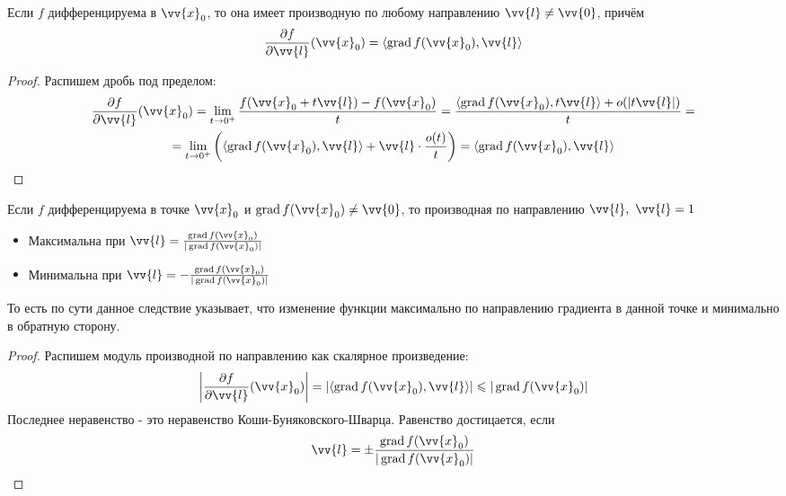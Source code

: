 \begin{proposition}
	Если $f$ дифференцируема в $\vv{x}_0$, то она имеет производную по любому направлению $\vv{l} \neq \vv{0}$, причём
	\[
		\pd{f}{\vv{l}} (\vv{x}_0) = \trbr{\grad f(\vv{x}_0), \vv{l}}
	\]
\end{proposition}

\begin{proof}
	Распишем дробь под пределом:
	\begin{multline*}
		\pd{f}{\vv{l}}(\vv{x}_0) = \liml_{t \to 0^+}\frac{f(\vv{x}_0 + t\vv{l}) - f(\vv{x}_0)}{t} = \frac{\trbr{\grad f(\vv{x}_0), t\vv{l}} + o(|t\vv{l}|)}{t} = \\
		= \liml_{t \to 0^+} \left(\trbr{\grad f(\vv{x}_0), \vv{l}} + \vv{l}\cdot \frac{o(t)}{t}\right) = \trbr{\grad f(\vv{x}_0), \vv{l}}
	\end{multline*}
\end{proof}

\begin{corollary}
	Если $f$ дифференцируема в точке $\vv{x}_0$ и $\grad f(\vv{x}_0) \neq \vv{0}$, то производная по направлению $\vv{l},\ \vv{l} = 1$
	\begin{itemize}
		\item Максимальна при $\vv{l} = \frac{\grad f(\vv{x}_0)}{|\grad f(\vv{x}_0)|}$
		
		\item Минимальна при $\vv{l} = -\frac{\grad f(\vv{x}_0)}{|\grad f(\vv{x}_0)|}$
	\end{itemize}
\end{corollary}

\begin{note}
	То есть по сути данное следствие указывает, что изменение функции максимально по направлению градиента в данной точке и минимально в обратную сторону.
\end{note}

\begin{proof}
	Распишем модуль производной по направлению как скалярное произведение:
	\[
		\left|\pd{f}{\vv{l}} (\vv{x}_0)\right| = \left|\trbr{\grad f(\vv{x}_0), \vv{l}}\right| \le |\grad f(\vv{x}_0)|
	\]
	Последнее неравенство - это неравенство Коши-Буняковского-Шварца. Равенство достицается, если
	\[
		\vv{l} = \pm \frac{\grad f(\vv{x}_0)}{|\grad f(\vv{x}_0)|}
	\]
\end{proof}